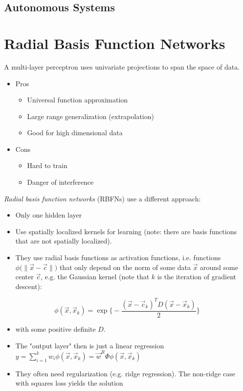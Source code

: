 		\subsection{Autonomous Systems} %
	
	
	\section{Radial Basis Function Networks} %
		
		A multi-layer perceptron uses univariate projections to span the space of data.
		\begin{itemize}
			\item Pros
				\begin{itemize}
					\item Universal function approximation
					\item Large range generalization (extrapolation)
					\item Good for high dimensional data
				\end{itemize}
			\item Cons
				\begin{itemize}
					\item Hard to train
					\item Danger of interference
				\end{itemize}
		\end{itemize}
		\emph{Radial basis function networks} (RBFNs) use a different approach:
		\begin{itemize}
			\item Only one hidden layer
			\item Use spatially localized kernels for learning (note: there are basis functions that are not spatially localized).
			\item They use radial basis functions as activation functions, i.e. functions \( \phi\big(\lVert \vec{x} - \vec{c} \rVert\big) \) that only depend on the norm of some data \(\vec{x}\) around some center \(\vec{c}\), e.g. the Gaussian kernel (note that \(k\) is the iteration of gradient descent):
		\end{itemize}
		\begin{equation}
			\phi(\vec{x}, \vec{x}_k) = \exp\Bigg\{ -\frac{(\vec{x} - \vec{c}_k)^T D (\vec{x} - \vec{x}_k)}{2} \Bigg\}
		\end{equation}
		\begin{itemize}
			\item[] with some positive definite \(D\).
			\item The "output layer" then is just a linear regression \( y = \sum_{i = 1}^{k} w_i \phi(\vec{x}, \vec{x}_k) = \vec{w}^R \Phi\phi(\vec{x}, \vec{x}_k) \)
			\item They often need regularization (e.g. ridge regression). The non-ridge case with squares loss yields the solution
		\end{itemize}
